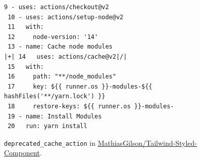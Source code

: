 \begin{figure}[htbp]
\centering
\begin{lstlisting}[style=ccscase]
  9 - uses: actions/checkout@v2
 10 - uses: actions/setup-node@v2
 11   with:
 12     node-version: '14'
 13 - name: Cache node modules
|+| 14   uses: actions/cache@v2|/|
 15   with:
 16     path: "**/node_modules"
 17     key: ${{ runner.os }}-modules-${{ hashFiles('**/yarn.lock') }}
 18     restore-keys: ${{ runner.os }}-modules-
 19 - name: Install Modules
 20   run: yarn install
\end{lstlisting}
\caption{\texttt{deprecated\_cache\_action} in \href{https://github.com/MathiasGilson/Tailwind-Styled-Component/blob/86be7109cc761123c142038efec7d54f2fc6b5f8/.github/workflows/test.yml}{MathiasGilson/Tailwind-Styled-Component}.}
\label{fig:ccs-deprecated-code}
\end{figure}
